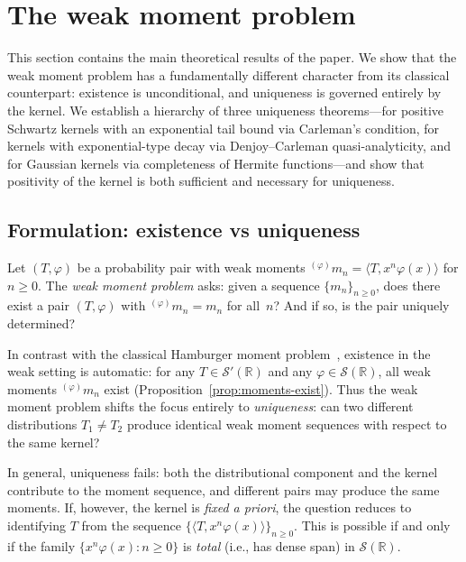 \documentclass[12pt]{article}
\theoremstyle{definition}
\newcommand{\R}{\mathbb{R}}
\begin{document}
\section{The weak moment problem}
\label{sec:moment_problem}

This section contains the main theoretical results of the paper.  We show that the weak moment problem has a fundamentally different character from its classical counterpart: existence is unconditional, and uniqueness is governed entirely by the kernel.  We establish a hierarchy of three uniqueness theorems---for positive Schwartz kernels with an exponential tail bound via Carleman's condition, for kernels with exponential-type decay via Denjoy--Carleman quasi-analyticity, and for Gaussian kernels via completeness of Hermite functions---and show that positivity of the kernel is both sufficient and necessary for uniqueness.

\subsection{Formulation: existence vs uniqueness}
\label{subsec:moment_formulation}

Let $(T,\varphi)$ be a probability pair with weak moments ${}^{(\varphi)}m_n = \langle T, x^n\varphi(x)\rangle$ for $n\ge 0$.  The \emph{weak moment problem} asks: given a sequence $\{m_n\}_{n\ge 0}$, does there exist a pair $(T,\varphi)$ with ${}^{(\varphi)}m_n = m_n$ for all~$n$?  And if so, is the pair uniquely determined?

In contrast with the classical Hamburger moment problem~\cite{Shohat1943}, existence in the weak setting is automatic: for any $T\in\mathcal{S}'(\R)$ and any $\varphi\in\mathcal{S}(\R)$, all weak moments ${}^{(\varphi)}m_n$ exist (Proposition~\ref{prop:moments-exist}).  Thus the weak moment problem shifts the focus entirely to \emph{uniqueness}: can two different distributions $T_1\ne T_2$ produce identical weak moment sequences with respect to the same kernel?

In general, uniqueness fails: both the distributional component and the kernel contribute to the moment sequence, and different pairs may produce the same moments.  If, however, the kernel is \emph{fixed a priori}, the question reduces to identifying $T$ from the sequence $\{\langle T, x^n\varphi(x)\rangle\}_{n\ge 0}$.  This is possible if and only if the family $\{x^n\varphi(x):n\ge 0\}$ is \emph{total} (i.e., has dense span) in $\mathcal{S}(\R)$.
\end{document}

